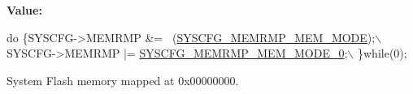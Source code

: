 {\bfseries Value\+:}
\begin{DoxyCode}
\textcolor{keywordflow}{do} \{SYSCFG->MEMRMP &= ~(\mbox{\hyperlink{group___peripheral___registers___bits___definition_ga3c05039ec67573c00da29f58b914f258}{SYSCFG\_MEMRMP\_MEM\_MODE}});\(\backslash\)
                                                         SYSCFG->MEMRMP |= 
      \mbox{\hyperlink{group___peripheral___registers___bits___definition_ga30d5f406535f94faea2e7f924d50201b}{SYSCFG\_MEMRMP\_MEM\_MODE\_0}};\(\backslash\)
                                                        \}\textcolor{keywordflow}{while}(0);
\end{DoxyCode}


System Flash memory mapped at 0x00000000. 

